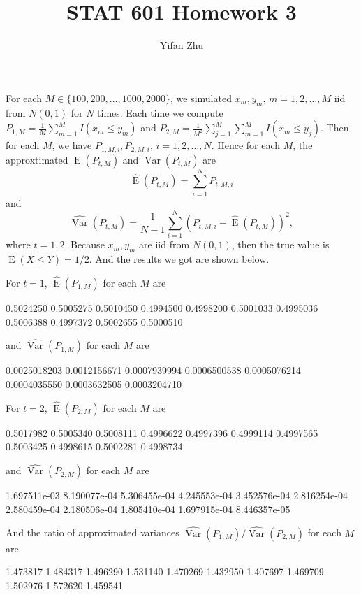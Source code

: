 \documentclass{article}
\DeclareMathOperator{\Var}{Var}
\DeclareMathOperator{\E}{E}
\begin{document}
	

	
	\title{STAT 601 Homework 3}
	\author{Yifan Zhu}
	\maketitle
	

	For each $ M \in \{100, 200, \ldots, 1000, 2000\}$, we simulated $x_m , y_m, \, m = 1,2,\ldots, M$ iid from $N(0,1)$ for $N$ times. Each time we compute $P_{1,M} = \frac{1}{M} \sum_{m=1}^M I(x_m \leq y_m)$ and $P_{2, M} = \frac{1}{M^2} \sum_{j=1}^M \sum_{m=1}^M I(x_m \leq y_j)$. Then for each $M$, we have $P_{1,M,i}, P_{2, M, i},\, i = 1,2,\ldots , N .$ Hence for each $M$, the approxtimated $\E(P_{t,M})$ and $\Var(P_{t,M})$ are 
	\[\widehat{\E}(P_{t,M}) = \sum_{i=1}^N P_{t,M,i}\]
	and 
	\[\widehat{\Var}(P_{t,M}) = \frac{1}{N-1}\sum_{i=1}^N \left(P_{t,M,i} - \widehat{\E}(P_{t,M})\right)^2,\]
	where $t = 1,2$.
	Because $x_m , y_m$ are iid from $N(0,1)$, then the true value is $\E(X \leq Y) = 1/2$. And the results we got are shown below.

	For $t = 1$, $\widehat{\E}(P_{1,M})$ for each $M$ are
	\begin{rcode}
0.5024250 0.5005275 0.5010450 0.4994500 0.4998200 0.5001033 0.4995036 0.5006388 0.4997372 0.5002655 0.5000510 
	\end{rcode}
	and $\widehat{\Var}(P_{1,M})$ for each $M$ are
	\begin{rcode}
0.0025018203 0.0012156671 0.0007939994 0.0006500538 0.0005076214 0.0004035550 0.0003632505 0.0003204710 
	\end{rcode}

		For $t = 2$, $\widehat{\E}(P_{2,M})$ for each $M$ are
	\begin{rcode}
0.5017982 0.5005340 0.5008111 0.4996622 0.4997396 0.4999114 0.4997565 0.5003425 0.4998615 0.5002281 0.4998734 
	\end{rcode}
	and $\widehat{\Var}(P_{2,M})$ for each $M$ are
	\begin{rcode}
1.697511e-03 8.190077e-04 5.306455e-04 4.245553e-04 3.452576e-04 2.816254e-04 2.580459e-04 2.180506e-04 1.805410e-04 1.697915e-04 8.446357e-05 
	\end{rcode}

	And the ratio of approximated variances $\widehat{\Var}(P_{1,M})\big/ \widehat{\Var}(P_{2,M})$ for each $M$ are
	\begin{rcode}
1.473817 1.484317 1.496290 1.531140 1.470269 1.432950 1.407697 1.469709 1.502976 1.572620 1.459541 
	 \end{rcode} 
\end{document}
